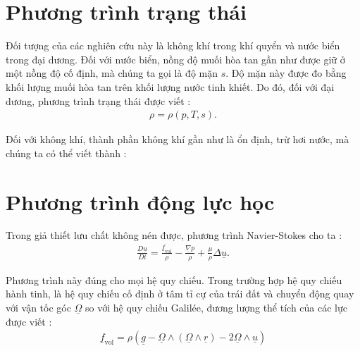 \documentclass[DONG_HOC_KHI_QUYEN.tex]{subfiles}
\begin{document}
\section{Phương trình trạng thái}
Đối tượng của các nghiên cứu này là không khí trong khí quyển và nước biển trong đại dương. Đối với nước biển, nồng độ muối hòa tan gần như được giữ ở một nồng độ cố định, mà chúng ta gọi là độ mặn $s$. Độ mặn này được đo bằng khối lượng muối hòa tan trên khối lượng nước tinh khiết. Do đó, đối với đại dương, phương trình trạng thái được viết :
\begin{equation}
    \begin{aligned}
        \rho=\rho\left(p,T,s\right).
    \end{aligned}
\end{equation}

Đối với không khí, thành phần không khí gần như là ổn định, trừ hơi nước, mà chúng ta có thể viết thành :


\section{Phương trình động lực học}

Trong giả thiết lưu chất không nén được, phương trình Navier-Stokes cho ta :
\begin{equation}\label{eq:navier_stokes_incompressible}
	\begin{aligned}
		\frac{D\underline{u}}{Dt}=\frac{\underline{f}_{\text{vol}}}{\rho}-\frac{\underline{\nabla}p}{\rho}+\frac{\mu}{\rho}\Delta\underline{u}.
	\end{aligned}
\end{equation}

Phương trình này đúng cho mọi hệ quy chiếu. Trong trường hợp hệ quy chiếu hành tinh, là hệ quy chiếu cố định ở tâm tỉ cự của trái đất và chuyển động quay với vận tốc góc $\underline{\Omega}$ so với hệ quy chiếu Galilée, đương lượng thể tích của các lực được viết :
\begin{equation}
	\begin{aligned}
		\underline{f}_{\text{vol}}=\rho\left(\underline{g}-\underline{\Omega}\wedge\left(\underline{\Omega}\wedge\underline{r}\right)-2\underline{\Omega}\wedge\underline{u}\right)
	\end{aligned}
\end{equation}
\end{document}
